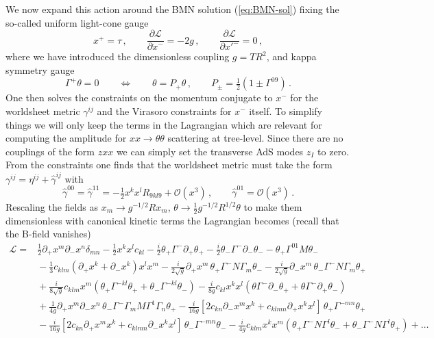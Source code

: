 \documentclass[a4paper,11pt]{article}
\begin{document}
We now expand this action around the BMN solution (\ref{eq:BMN-sol}) fixing the so-called uniform light-cone gauge
\begin{equation}
x^+=\tau\,,\qquad\frac{\partial\mathcal L}{\partial\dot x^-}=-2g\,,\qquad\frac{\partial\mathcal L}{\partial x'^-}=0\,,
\end{equation}
where we have introduced the dimensionless coupling $g=TR^2$, and kappa symmetry gauge
\begin{equation}
\Gamma^+\theta=0\qquad\Leftrightarrow\qquad \theta=P_+\theta\,,\qquad P_\pm=\tfrac12(1\pm\Gamma^{09})\,.
\end{equation}
One then solves the constraints on the momentum conjugate to $x^-$ for the worldsheet metric $\gamma^{ij}$ and the Virasoro constraints for $x^-$ itself. To simplify things we will only keep the terms in the Lagrangian which are relevant for computing the amplitude for $xx\rightarrow\theta\theta$ scattering at tree-level. Since there are no couplings of the form $zxx$ we can simply set the transverse AdS modes $z_I$ to zero. From the constraints one finds that the worldsheet metric must take the form $\gamma^{ij}=\eta^{ij}+\hat\gamma^{ij}$ with
\begin{equation}
\hat\gamma^{00}=\hat\gamma^{11}=-\tfrac12x^kx^lR_{9kl9}+\mathcal O(x^3)
\,,\qquad
\hat\gamma^{01}
=\mathcal O(x^3)\,.
\end{equation}
Rescaling the fields as $x_m\rightarrow g^{-1/2}Rx_m$, $\theta\rightarrow \frac12g^{-1/2}R^{1/2}\theta$ to make them dimensionless with canonical kinetic terms the Lagrangian becomes (recall that the B-field vanishes)
\begin{align}
\label{eq:L1}
\mathcal L=&
\tfrac12\partial_+x^m\partial_-x^n\delta_{mn}
-\tfrac12x^kx^lc_{kl}
-\tfrac{i}{2}\theta_+\Gamma^-\partial_+\theta_+
-\tfrac{i}{2}\theta_-\Gamma^-\partial_-\theta_-
-\theta_+\Gamma^{01}M\theta_-
\\
&{}
-\tfrac13c_{klm}(\partial_+x^k+\partial_-x^k)x^lx^m
-\tfrac{i}{2\sqrt g}\partial_+x^m\,\theta_+\Gamma^-N\Gamma_m\theta_-
-\tfrac{i}{2\sqrt g}\partial_-x^m\,\theta_-\Gamma^-N\Gamma_m\theta_+
\nonumber\\
&{}
+\tfrac{i}{8\sqrt g}c_{klm}x^m(\theta_+\Gamma^{-kl}\theta_++\theta_-\Gamma^{-kl}\theta_-)
-\tfrac{i}{8g}c_{kl}x^kx^l(\theta\Gamma^-\partial_-\theta_++\theta\Gamma^-\partial_+\theta_-)
\nonumber\\
&{}
+\tfrac{1}{4g}\partial_+x^m\partial_-x^n\,\theta_-\Gamma^-\Gamma_mM\Gamma^1\Gamma_n\theta_+
-\tfrac{i}{16g}[2c_{kn}\partial_-x^mx^k+c_{klmn}\partial_+x^kx^l]\,\theta_+\Gamma^{-mn}\theta_+
\nonumber\\
&{}
-\tfrac{i}{16g}[2c_{kn}\partial_+x^mx^k+c_{klmn}\partial_-x^kx^l]\,\theta_-\Gamma^{-mn}\theta_-
-\tfrac{i}{4g}c_{klm}x^kx^m(\theta_+\Gamma^-N\Gamma^l\theta_-+\theta_-\Gamma^-N\Gamma^l\theta_+)
+\ldots
\nonumber
\end{align}
\end{document}
